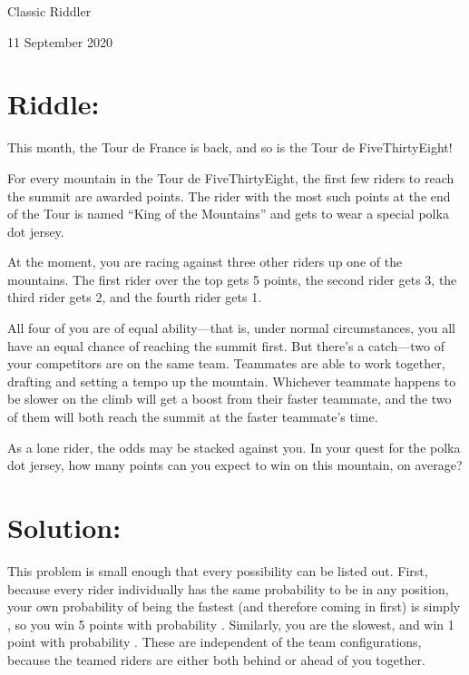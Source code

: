 \documentclass{article}
\begin{document}
\pagestyle{empty} %

\begin{center}
{\LARGE Classic Riddler}

\vspace{0.15in}

{\Large 11 September 2020}
\end{center}


\section*{Riddle:}

This month, the Tour de France is back, and so is the Tour de FiveThirtyEight!

For every mountain in the Tour de FiveThirtyEight, the first few riders to reach the summit are awarded points.
The rider with the most such points at the end of the Tour is named ``King of the Mountains'' and gets to wear a special polka dot jersey.

At the moment, you are racing against three other riders up one of the mountains.
The first rider over the top gets 5 points, the second rider gets 3, the third rider gets 2, and the fourth rider gets 1.

All four of you are of equal ability---that is, under normal circumstances, you all have an equal chance of reaching the summit first.
But there's a catch---two of your competitors are on the same team.
Teammates are able to work together, drafting and setting a tempo up the mountain.
Whichever teammate happens to be slower on the climb will get a boost from their faster teammate, and the two of them will both reach the summit at the faster teammate's time.

As a lone rider, the odds may be stacked against you.
In your quest for the polka dot jersey, how many points can you expect to win on this mountain, on average?

\section*{Solution:}

This problem is small enough that every possibility can be listed out.
First, because every rider individually has the same probability to be in any position, your own probability of being the fastest (and therefore coming in first) is simply , so you win 5 points with probability .
Similarly, you are the slowest, and win 1 point with probability .
These are independent of the team configurations, because the teamed riders are either both behind or ahead of you together.
\end{document}
